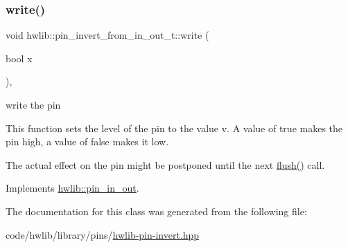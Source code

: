 \subsubsection{\texorpdfstring{write()}{write()}}
{\footnotesize\ttfamily void hwlib\+::pin\+\_\+invert\+\_\+from\+\_\+in\+\_\+out\+\_\+t\+::write (\begin{DoxyParamCaption}\item[{bool}]{x }\end{DoxyParamCaption})\hspace{0.3cm}{\ttfamily [inline]}, {\ttfamily [virtual]}}

write the pin

This function sets the level of the pin to the value v. A value of true makes the pin high, a value of false makes it low.

The actual effect on the pin might be postponed until the next \hyperlink{classhwlib_1_1pin__invert__from__in__out__t_ab8eefcc2f37559eb78935a72bcdd32ae}{flush()} call. 

Implements \hyperlink{classhwlib_1_1pin__in__out_aa5e2adcb5707f86c20b6306fc09f1582}{hwlib\+::pin\+\_\+in\+\_\+out}.



The documentation for this class was generated from the following file\+:\begin{DoxyCompactItemize}
\item 
code/hwlib/library/pins/\hyperlink{hwlib-pin-invert_8hpp}{hwlib-\/pin-\/invert.\+hpp}\end{DoxyCompactItemize}

